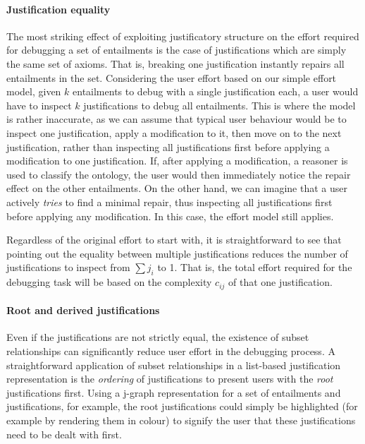 \paragraph{Justification equality}

The most striking effect of exploiting justificatory structure on the effort required for debugging a set of entailments is the case of justifications which are simply the same set of axioms. That is, breaking one justification instantly repairs all entailments in the set. Considering the user effort based on our simple effort model, given $k$ entailments to debug with a single justification each, a user would have to inspect $k$ justifications to debug all entailments. This is where the model is rather inaccurate, as we can assume that typical user behaviour would be to inspect one justification, apply a modification to it, then move on to the next justification, rather than inspecting all justifications first before applying a modification to one justification. If, after applying a modification, a reasoner is used to classify the ontology, the user would then immediately notice the repair effect on the other entailments. On the other hand, we can imagine that a user actively \emph{tries} to find a minimal repair, thus inspecting all justifications first before applying any modification. In this case, the effort model still applies.

Regardless of the original effort to start with, it is straightforward to see that pointing out the equality between multiple justifications reduces the number of justifications to inspect from $\sum j_{i}$ to 1. That is, the total effort required for the debugging task will be based on the complexity $c_{ij}$ of that one justification. 

\paragraph{Root and derived justifications}

Even if the justifications are not strictly equal, the existence of subset relationships can significantly reduce user effort in the debugging process. A straightforward application of subset relationships in a list-based justification representation is the \emph{ordering} of justifications to present users with the \emph{root} justifications first. Using a j-graph representation for a set of entailments and justifications, for example, the root justifications could simply be highlighted (for example by rendering them in colour) to signify the user that these justifications need to be dealt with first. 

